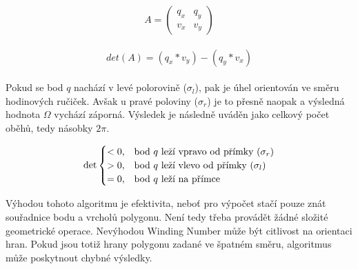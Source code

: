 \begin{equation*}
A=\begin{pmatrix} q_x & q_y \\ v_x & v_y  \end{pmatrix}
\end{equation*}\\

\begin{equation*}
det(A) = (q_x*v_y)-(q_y*v_x)
\end{equation*}\\

\noindent Pokud se bod $q$ nachází v levé polorovině ($\sigma_l$), pak je úhel orientován ve směru hodinových ručiček. Avšak u pravé poloviny ($\sigma_r$) je to přesně naopak a výsledná hodnota $\Omega$ vychází záporná. Výsledek je následně uváděn jako celkový počet oběhů, tedy násobky $2 \pi$.
\vspace{0.8cm}

\begin{equation*} 
\text{det}\begin{cases} < 0, & \text{bod \( q \) leží vpravo od přímky ($\sigma_r$)} \\ > 0,& \text{bod \( q \) leží vlevo od přímky ($\sigma_l$)} \\ = 0 , & \text{bod \( q \) leží na přímce} \end{cases}
\end{equation*}
\vspace{0.8cm}

\noindent Výhodou tohoto algoritmu je efektivita, neboť pro výpočet stačí pouze znát souřadnice bodu a vrcholů polygonu. Není tedy třeba provádět žádné složité geometrické operace. Nevýhodou Winding Number může být citlivost na orientaci hran. Pokud jsou totiž hrany polygonu zadané ve špatném směru, algoritmus může poskytnout chybné výsledky.

